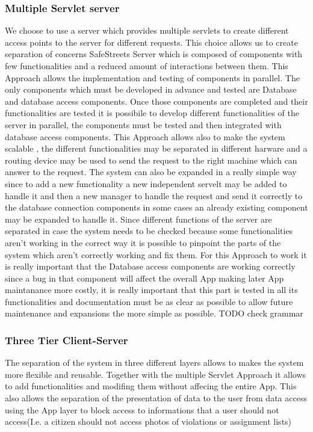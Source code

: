 \subsubsection{Multiple Servlet server}
We choose to use a server which provides multiple servlets to create different access points to the server for different requests. This choice allows us to create separation of concerns SafeStreets Server which is composed of components with few functionalities and a reduced amount of interactions between them. This Approach allows the implementation and testing of components in parallel. The only components which must be developed in advance and tested are Database and database access components. Once those components  are completed  and their functionalities are tested it is possibile to develop different functionalities of the server in parallel, the components must be tested and then integrated with database access components. This Approach allows also to make the system scalable , the different functionalities may be separated in different harware and a routing device may be used to send the request to the right machine which can answer to the request. The system can also be expanded in a really simple way since to add a new functionality a new independent servelt may be added to handle it and then a new manager to handle the request and send it correctly to the database connection components in some cases an  already existing component may be expanded to handle it.
Since different functions of the server are separated in case the system needs to be checked because some functionalities aren't working in the correct way it is possible to pinpoint the parts of the system which aren't correctly working and fix them. For this Approach to work it is really important that the Database access components are working correctly since a bug in that component will affect the overall App making later App maintanance more costly, it is really important that this part is tested in all its functionalities and documentation must be as clear as possible to allow future maintenance and expansions the more simple as possible.
TODO check grammar

\subsubsection{Three Tier Client-Server}

The separation of the system in three different layers allows to makes the system more flexible and reusable.
Together with the multiple Servlet Approach it allows to add functionalities and modifing them without affecing the entire App.
This also allows the separation of the presentation of data to the user from data access using the App layer to block access to informations that a user should not access(I.e. a citizen should not access photos of violations or assignment lists)

